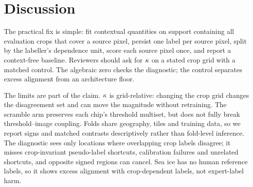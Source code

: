 \section{Discussion}
\label{sec:recs}

The practical fix is simple: fit contextual quantities on support containing all
evaluation crops that cover a source pixel, persist one label per source pixel,
split by the labeller's dependence unit, score each source pixel once, and report a
context-free baseline. Reviewers should ask for $\kappa$ on a stated crop grid with a
matched control. The algebraic zero checks the diagnostic; the control separates
excess alignment from an architecture floor.

The limits are part of the claim. $\kappa$ is grid-relative: changing the crop grid
changes the disagreement set and can move the magnitude without retraining. The
scramble arm preserves each chip's threshold multiset, but does not fully break
threshold--image coupling. Folds share geography, tiles and training data, so we
report signs and matched contrasts descriptively rather than fold-level inference.
The diagnostic sees only locations where overlapping crop labels disagree; it misses
crop-invariant pseudo-label shortcuts, calibration failures and unrelated shortcuts,
and opposite signed regions can cancel. Sea ice has no human reference labels, so it
shows excess alignment with crop-dependent labels, not expert-label harm.
